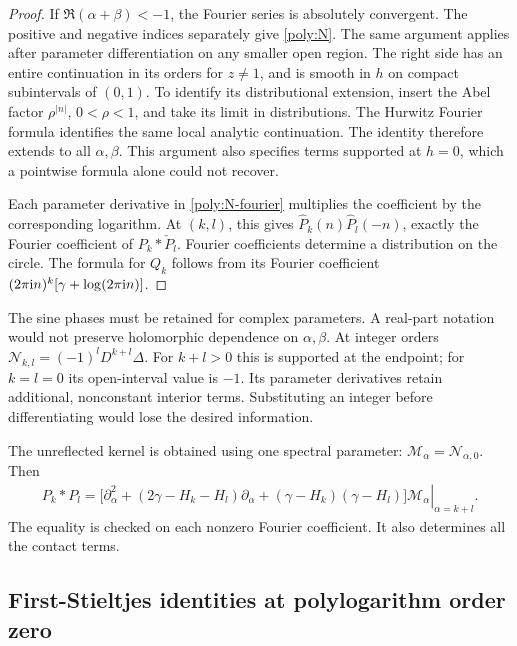 \begin{proof}
If \(\Re(\alpha+\beta)<-1\), the Fourier series is absolutely convergent.
The positive and negative indices separately give
\eqref{poly:N}. The same argument applies after parameter
differentiation on any smaller open region. The right side has an
entire continuation in its orders for \(z\ne1\), and is smooth in \(h\)
on compact subintervals of \((0,1)\). To identify its distributional
extension, insert the Abel factor \(\rho^{|n|}\), \(0<\rho<1\),
and take its limit in distributions. The Hurwitz Fourier formula
identifies the same local analytic continuation. The identity
therefore extends to all \(\alpha,\beta\). This argument also
specifies terms supported at \(h=0\), which a pointwise formula alone
could not recover.

Each parameter derivative in \eqref{poly:N-fourier} multiplies the
coefficient by the corresponding logarithm. At \((k,l)\), this gives
\(\widehat P_k(n)\widehat P_l(-n)\), exactly the Fourier coefficient of
\(P_k*\check P_l\). Fourier coefficients determine a distribution on
the circle. The formula for \(Q_k\) follows from its Fourier coefficient
\((2\pi\mathrm i n)^k[\gamma+\log(2\pi\mathrm i n)]\).
\end{proof}

The sine phases must be retained for complex parameters. A real-part
notation would not preserve holomorphic dependence on
\(\alpha,\beta\). At integer orders
\(\mathcal N_{k,l}=(-1)^lD^{k+l}\Delta\).
For \(k+l>0\) this is supported at the endpoint; for \(k=l=0\) its
open-interval value is \(-1\). Its parameter derivatives retain
additional, nonconstant interior terms. Substituting an integer
before differentiating would lose the desired information.

The unreflected kernel is obtained using one spectral parameter:
\(\mathcal M_\alpha=\mathcal N_{\alpha,0}\). Then
\begin{align}\label{poly:unreflected}
 P_k*P_l=\left.
 \bigl[\partial_\alpha^2
  +(2\gamma-H_k-H_l)\partial_\alpha
  +(\gamma-H_k)(\gamma-H_l)\bigr]\mathcal M_\alpha
 \right|_{\alpha=k+l}.
\end{align}
The equality is checked on each nonzero Fourier coefficient.
It also determines all the contact terms.

\subsection{First-Stieltjes identities at polylogarithm order zero}


